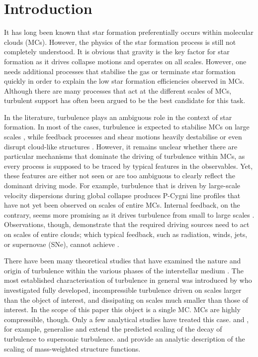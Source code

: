 \section{Introduction}\label{intro}

It has long been known that star formation preferentially occurs within molecular clouds (MCs). 
However, the physics of the star formation process is still not completely understood.
It is obvious that gravity is the key factor for star formation as it drives collapse motions and operates on all scales.
However, one needs additional processes that stabilise the gas or terminate star formation quickly in order to explain the low star formation efficiencies observed in MCs. 
Although there are many processes that act at the different scales of MCs, turbulent support has often been argued to be the best candidate for this task.

In the literature, turbulence plays an ambiguous role in the context of star formation. 
In most of the cases, turbulence is expected to stabilise MCs on large scales \citep{Fleck1980,McKee1992,MacLow2003}, while feedback processes and shear motions heavily destabilise or even disrupt cloud-like structures \citep{Tan2013,Miyamoto2014}. 
However, it remains unclear whether there are particular mechanisms that dominate the driving of turbulence within MCs, as every process is supposed to be traced by typical features in the observables.
Yet, these features are either not seen or are too ambiguous to clearly reflect the dominant driving mode.
For example, turbulence that is driven by large-scale velocity dispersions during global collapse \citep{Ballesteros2011a,Ballesteros2011b,Hartmann2012} produces P-Cygni line profiles that have not yet been observed on scales of entire MCs. 
Internal feedback, on the contrary, seems more promising as it drives turbulence from small to large scales \citep{Dekel2013,Krumholz2014}.
Observations, though, demonstrate that the required driving sources need to act on scales of entire clouds; which typical feedback, such as radiation, winds, jets, or supernovae (SNe), cannot achieve \citep{Heyer2004,Brunt2009,Brunt2013}.

There have been many theoretical studies that have examined the nature and origin of turbulence within the various phases of the interstellar medium \citep[ISM;][and references within]{MacLow2004}. 
The most established characterisation of turbulence in general was introduced by \citet{Kolmogorov1941} who investigated fully developed, incompressible turbulence driven on scales larger than the object of interest, and dissipating on scales much smaller than those of interest.
In the scope of this paper this object is a single MC. 
MCs are highly compressible, though.
Only a few analytical studies have treated this case.
\citet{She1994} and \citet{Boldyrev2002}, for example, generalise and extend the predicted scaling of the decay of turbulence to supersonic turbulence.
\citet{Galtier2011} and \citet{Banerjee2013} provide an analytic description of the scaling of mass-weighted structure functions.

